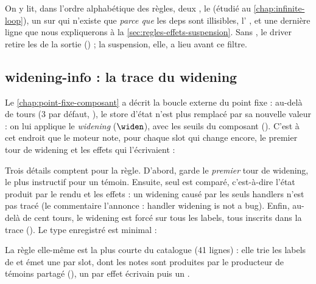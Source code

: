 On y lit, dans l'ordre alphabétique des règles, deux \Info{} , le \Warning{}  (étudié au \cref{chap:infinite-loop}), un \Warning{}  sur  qui n'existe que \emph{parce que} les deps sont illisibles, l'\Info{} , et une dernière ligne  que nous expliquerons à la \cref{sec:regles-effets-suspension}. Sans , le driver retire les \Info{} de la sortie () ; la suspension, elle, a lieu avant ce filtre.

\subsection{widening-info : la trace du widening}

Le \cref{chap:point-fixe-composant} a décrit la boucle externe du point fixe : au-delà de  tours (3 par défaut, ), le store d'état n'est plus remplacé par sa nouvelle valeur : on lui applique le \emph{widening} ($\widen$), avec les seuils du composant (). C'est à cet endroit que le moteur note, pour chaque slot qui change encore, le premier tour de widening et les effets qui l'écrivaient :


Trois détails comptent pour la règle. D'abord,  garde le \emph{premier} tour de widening, le plus instructif pour un témoin. Ensuite, seul  est comparé, c'est-à-dire l'état produit par le rendu et les effets : un widening causé par les seuls handlers n'est pas tracé (le commentaire l'annonce : \og handler widening is not a bug\fg{}). Enfin, au-delà de cent tours, le widening est forcé sur tous les labels, tous inscrits dans la trace (). Le type enregistré est minimal :


La règle elle-même est la plus courte du catalogue (41 lignes) : elle trie les labels de  et émet une \Info{} par slot, dont les notes sont produites par le producteur de témoins partagé  (), un  par effet écrivain puis un .



